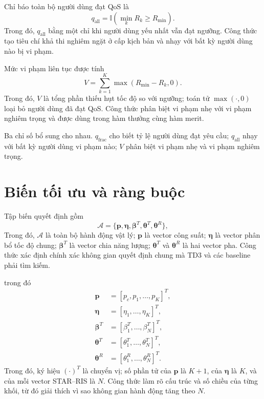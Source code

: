 Chỉ báo toàn bộ người dùng đạt QoS là
\begin{equation}
 q_{\mathrm{all}}=\mathbb{I}\!\left(\min_k R_k\ge R_{\min}\right).
 \label{eq:all-qos-ch2}
\end{equation}
Trong đó, $q_{\mathrm{all}}$ bằng một chỉ khi người dùng yếu nhất vẫn đạt ngưỡng. Công thức tạo tiêu chí khả thi nghiêm ngặt ở cấp kịch bản và nhạy với bất kỳ người dùng nào bị vi phạm.

Mức vi phạm liên tục được tính
\begin{equation}
 V=\sum_{k=1}^{K}\max(R_{\min}-R_k,0).
 \label{eq:violation-ch2}
\end{equation}
Trong đó, $V$ là tổng phần thiếu hụt tốc độ so với ngưỡng; toán tử $\max(\cdot,0)$ loại bỏ người dùng đã đạt QoS. Công thức phân biệt vi phạm nhẹ với vi phạm nghiêm trọng và được dùng trong hàm thưởng cùng hàm merit.

Ba chỉ số bổ sung cho nhau. $q_{\mathrm{frac}}$ cho biết tỷ lệ người dùng đạt yêu cầu; $q_{\mathrm{all}}$ nhạy với bất kỳ người dùng vi phạm nào; $V$ phân biệt vi phạm nhẹ và vi phạm nghiêm trọng.

\section{Biến tối ưu và ràng buộc}
Tập biến quyết định gồm
\begin{equation}
 \mathcal{A}=\{\bm p,\bm\eta,\bm\beta^T,\bm\theta^T,\bm\theta^R\},
\end{equation}
Trong đó, $\mathcal A$ là toàn bộ hành động vật lý; $\bm p$ là vector công suất; $\bm\eta$ là vector phân bổ tốc độ chung; $\bm\beta^T$ là vector chia năng lượng; $\bm\theta^T$ và $\bm\theta^R$ là hai vector pha. Công thức xác định chính xác không gian quyết định chung mà TD3 và các baseline phải tìm kiếm.

trong đó
\begin{align}
 \bm p&=[p_c,p_1,\ldots,p_K]^T,\\
 \bm\eta&=[\eta_1,\ldots,\eta_K]^T,\\
 \bm\beta^T&=[\beta_1^T,\ldots,\beta_N^T]^T,\\
 \bm\theta^T&=[\theta_1^T,\ldots,\theta_N^T]^T,\\
 \bm\theta^R&=[\theta_1^R,\ldots,\theta_N^R]^T.
\end{align}
Trong đó, ký hiệu $(\cdot)^T$ là chuyển vị; số phần tử của $\bm p$ là $K+1$, của $\bm\eta$ là $K$, và của mỗi vector STAR--RIS là $N$. Công thức làm rõ cấu trúc và số chiều của từng khối, từ đó giải thích vì sao không gian hành động tăng theo $N$.


